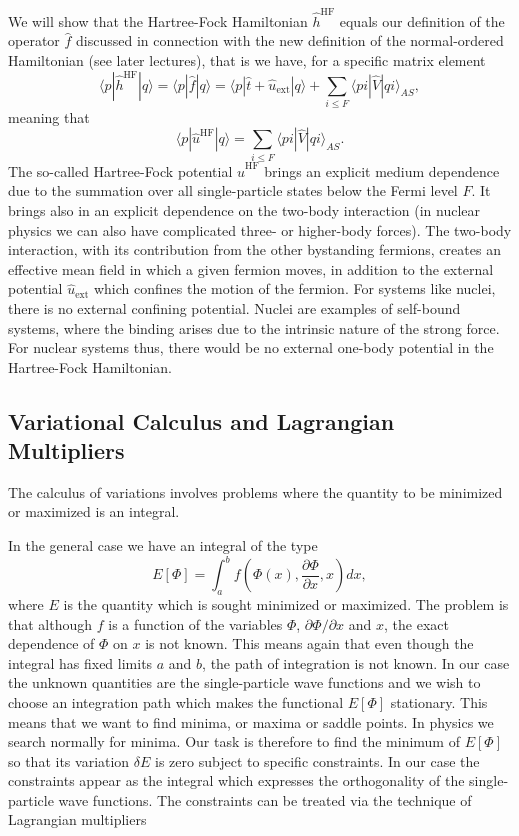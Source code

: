 \documentclass[%
oneside,                 %
final,                   %
10pt]{article}
\begin{document}
\noindent
We will show that the Hartree-Fock Hamiltonian $\hat{h}^{\mathrm{HF}}$ equals our definition of the operator $\hat{f}$ discussed in connection with the new definition of the normal-ordered Hamiltonian (see later lectures), that is we have, for a specific matrix element
\[
\langle p |\hat{h}^{\mathrm{HF}}| q \rangle =\langle p |\hat{f}| q \rangle=\langle p|\hat{t}+\hat{u}_{\mathrm{ext}}|q \rangle +\sum_{i\le F} \langle pi | \hat{V} | qi\rangle_{AS},
\]
meaning that
\[
\langle p|\hat{u}^{\mathrm{HF}}|q\rangle = \sum_{i\le F} \langle pi | \hat{V} | qi\rangle_{AS}.
\]
The so-called Hartree-Fock potential $\hat{u}^{\mathrm{HF}}$ brings an explicit medium dependence due to the summation over all single-particle states below the Fermi level $F$. It brings also in an explicit dependence on the two-body interaction (in nuclear physics we can also have complicated three- or higher-body forces). The two-body interaction, with its contribution from the other bystanding fermions, creates an effective mean field in which a given fermion moves, in addition to the external potential $\hat{u}_{\mathrm{ext}}$ which confines the motion of the fermion. For systems like nuclei, there is no external confining potential. Nuclei are examples of self-bound systems, where the binding arises due to the intrinsic nature of the strong force. For nuclear systems thus, there would be no external one-body potential in the Hartree-Fock Hamiltonian. 

\subsection*{Variational Calculus and Lagrangian Multipliers}

The calculus of variations involves 
problems where the quantity to be minimized or maximized is an integral. 

In the general case we have an integral of the type
\[ 
E[\Phi]= \int_a^b f(\Phi(x),\frac{\partial \Phi}{\partial x},x)dx,
\]
where $E$ is the quantity which is sought minimized or maximized.
The problem is that although $f$ is a function of the variables $\Phi$, $\partial \Phi/\partial x$ and $x$, the exact dependence of
$\Phi$ on $x$ is not known.  This means again that even though the integral has fixed limits $a$ and $b$, the path of integration is
not known. In our case the unknown quantities are the single-particle wave functions and we wish to choose an integration path which makes
the functional $E[\Phi]$ stationary. This means that we want to find minima, or maxima or saddle points. In physics we search normally for minima.
Our task is therefore to find the minimum of $E[\Phi]$ so that its variation $\delta E$ is zero  subject to specific
constraints. In our case the constraints appear as the integral which expresses the orthogonality of the  single-particle wave functions.
The constraints can be treated via the technique of Lagrangian multipliers
\end{document}
